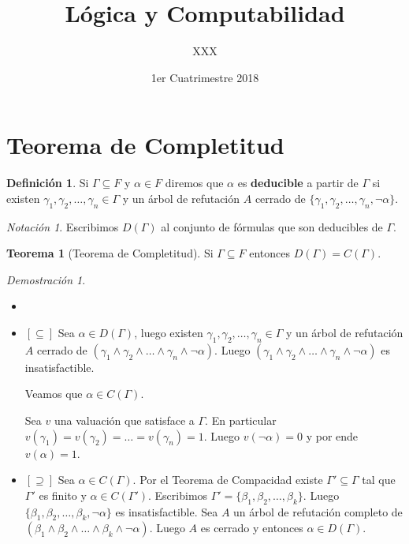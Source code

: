 \documentclass[a4paper,11pt]{article}
\title{Lógica y Computabilidad}
\author{XXX}
\date{1er Cuatrimestre 2018}
\theoremstyle{definition}
\newtheorem{defn}{Definición}[section]
\newtheorem{teor}{Teorema}[section]
\theoremstyle{remark}
\newtheorem*{notc}{Notación}
\newtheorem*{demo}{Demostración}
\begin{document}
\maketitle

\section{Teorema de Completitud}

\begin{defn}
    Si $\Gamma \subseteq F$ y $\alpha \in F$ diremos que $\alpha$ es \textbf{deducible}
    a partir de $\Gamma$ si existen $\gamma_1, \gamma_2, \dots, \gamma_n \in \Gamma$ y
    un árbol de refutación $A$ cerrado de $\{\gamma_1, \gamma_2, \dots, \gamma_n, \lnot\alpha\}$.
\end{defn}

\begin{notc}
    Escribimos $D(\Gamma)$ al conjunto de fórmulas que son deducibles de $\Gamma$.
\end{notc}

\begin{teor}[Teorema de Completitud]
    Si $\Gamma \subseteq F$ entonces $D(\Gamma) = C(\Gamma)$.
\end{teor}

\begin{demo}
    \begin{itemize}
        \item[]
        
        \item[] $[\subseteq]$ Sea $\alpha \in D(\Gamma)$, luego existen 
        $\gamma_1, \gamma_2, \dots, \gamma_n \in \Gamma$ y un árbol de refutación $A$ cerrado de 
        $(\gamma_1 \land \gamma_2 \land \dots \land \gamma_n \land \lnot \alpha)$.
        Luego $(\gamma_1 \land \gamma_2 \land \dots \land \gamma_n \land \lnot \alpha)$ es
        insatisfactible.
        
        Veamos que $\alpha \in C(\Gamma)$.
        
        Sea $v$ una valuación que satisface a $\Gamma$. En particular $v(\gamma_1) = v(\gamma_2) 
        = \dots = v(\gamma_n) = 1$. Luego $v(\lnot\alpha) = 0$ y por ende $v(\alpha) = 1$.
        
        \item[] $[\supseteq]$ Sea $\alpha \in C(\Gamma)$. Por el Teorema de Compacidad existe
        $\Gamma' \subseteq \Gamma$ tal que $\Gamma'$ es finito y $\alpha \in C(\Gamma')$. 
        Escribimos $\Gamma' = \{\beta_1, \beta_2, \ldots, \beta_k\}$. Luego 
        $\{\beta_1, \beta_2, \ldots, \beta_k, \lnot\alpha\}$ es insatisfactible. 
        Sea $A$ un árbol de refutación completo de $(\beta_1 \land \beta_2 \land \ldots \land 
        \beta_k \land \lnot\alpha)$. Luego $A$ es cerrado y entonces $\alpha \in D(\Gamma)$.
    \end{itemize}
\end{demo}
\end{document}
